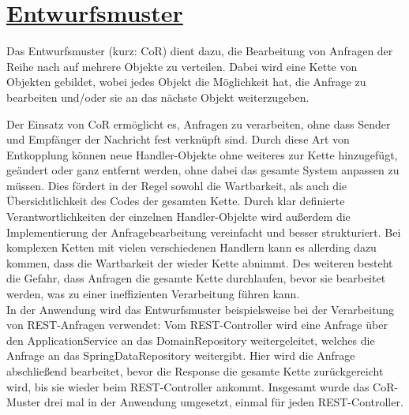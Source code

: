 \section{\href{https://sourcemaking.com/design_patterns/chain_of_responsibility}{Entwurfsmuster}}
Das Entwurfsmuster  (kurz: CoR) dient dazu, die Bearbeitung von Anfragen der Reihe nach auf mehrere Objekte zu verteilen. Dabei wird eine Kette von Objekten gebildet, wobei jedes Objekt die Möglichkeit hat, die Anfrage zu bearbeiten und/oder sie an das nächste Objekt weiterzugeben. 


Der Einsatz von CoR ermöglicht es, Anfragen zu verarbeiten, ohne dass Sender und Empfänger der Nachricht fest verknüpft sind. Durch diese Art von Entkopplung können neue Handler-Objekte ohne weiteres zur Kette hinzugefügt, geändert oder ganz entfernt werden, ohne dabei das gesamte System anpassen zu müssen. Dies fördert in der Regel sowohl die Wartbarkeit, als auch die Übersichtlichkeit des Codes der gesamten Kette. Durch klar definierte Verantwortlichkeiten der einzelnen Handler-Objekte wird außerdem die Implementierung der Anfragebearbeitung vereinfacht und besser strukturiert. Bei komplexen Ketten mit vielen verschiedenen Handlern kann es allerding dazu kommen, dass die Wartbarkeit der wieder Kette abnimmt. Des weiteren besteht die Gefahr, dass Anfragen die gesamte Kette durchlaufen, bevor sie bearbeitet werden, was zu einer ineffizienten Verarbeitung führen kann.\\


\noindent{}In der Anwendung wird das Entwurfsmuster beispielsweise bei der Verarbeitung von REST-Anfragen verwendet: Vom REST-Controller wird eine Anfrage über den ApplicationService an das DomainRepository weitergeleitet, welches die Anfrage an das SpringDataRepository weitergibt. Hier wird die Anfrage abschließend bearbeitet, bevor die Response die gesamte Kette zurückgereicht wird, bis sie wieder beim REST-Controller ankommt. Insgesamt wurde das CoR-Muster drei mal in der Anwendung umgesetzt, einmal für jeden REST-Controller.